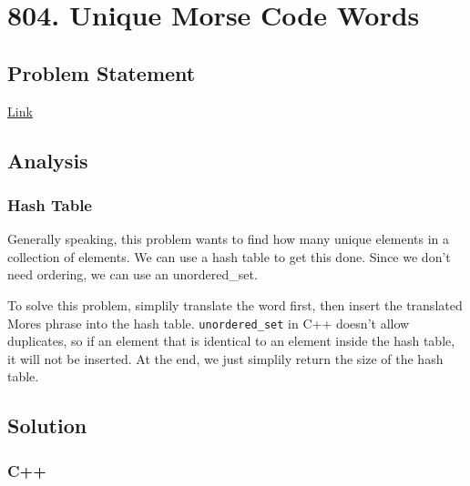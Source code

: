 \documentclass[11pt]{article}
\begin{document}
\section{804. Unique Morse Code Words}
\label{sec:org51f2a03}
\subsection{Problem Statement}
\label{sec:orgb958031}
\href{https://leetcode.com/problems/unique-morse-code-words/}{Link}
\subsection{Analysis}
\label{sec:orgeacbdf9}
\subsubsection{Hash Table}
\label{sec:orgbe32c6e}
Generally speaking, this problem wants to find how many unique elements in a collection of elements. We can use a hash table to get this done. Since we don't need ordering, we can use an unordered\_set.

To solve this problem, simplily translate the word first, then insert the translated Mores phrase into the hash table. \texttt{unordered\_set} in C++ doesn't allow duplicates, so if an element that is identical to an element inside the hash table, it will not be inserted. At the end, we just simplily return the size of the hash table.
\subsection{Solution}
\label{sec:orga5a2266}
\subsubsection{C++}
\label{sec:org640a47f}
\end{document}
